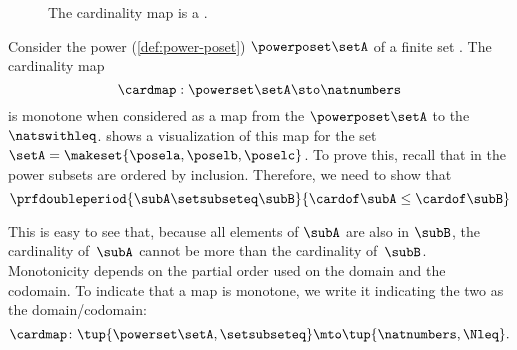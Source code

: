 \begin{figure*}[b]
    \centering
    \caption{The cardinality map is a . }
    \label{fig:cardinality}
\end{figure*}

\begin{example}\label{exa:cardinality}
    Consider the power  (\cref{def:power-poset}) $\powerposet\setA$ of a finite set \setA.
    The cardinality map
    \begin{equation}\label{eq:cardinality-map}
        \cardmap : \powerset\setA \sto \natnumbers
    \end{equation}
    is monotone when considered as a map from the  $\powerposet\setA$ to the  $\natswithleq$.
     shows a visualization of this map for the set~$\setA=\makeset{\posela,\poselb,\poselc}$.
    To prove this, recall that in the power  subsets are ordered by inclusion.
    Therefore, we need to show that
    \begin{equation}\label{eq:cardinality}
        \prfdoubleperiod{
            \subA \setsubseteq \subB
        }{
            \cardof \subA \leq \cardof \subB
        }
    \end{equation}
    
    This is easy to see that, because all elements of $\subA$ are also in $\subB$, the cardinality of~$\subA$ cannot be more than the cardinality of~$\subB$.
    Monotonicity depends on the partial order used on the domain and the codomain.
    To indicate that a map is monotone, we write it indicating the two  as the domain/codomain:
    \begin{equation}\label{eq:cardinality-as-posmap}
        \cardmap \colon \tup{\powerset\setA, \setsubseteq} \mto \tup{\natnumbers, {{\Nleq}}}.
    \end{equation}
\end{example}

